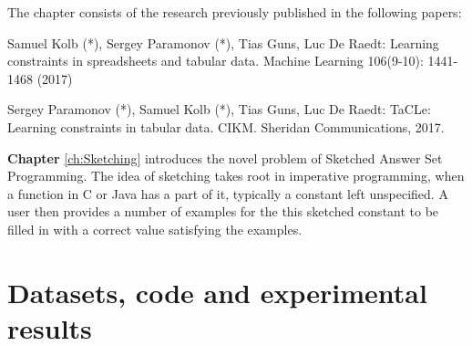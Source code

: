 The chapter consists of the research previously published in the following papers:

\begin{addmargin}[2em]{2em}
Samuel Kolb (*), Sergey Paramonov (*), Tias Guns, Luc De Raedt:
  Learning constraints in spreadsheets and tabular data. Machine
  Learning 106(9-10): 1441-1468 (2017)


Sergey Paramonov (*), Samuel Kolb (*), Tias Guns, Luc De Raedt:
TaCLe: Learning constraints in tabular data. CIKM. Sheridan
Communications, 2017.
\end{addmargin}


\textbf{Chapter} \ref{ch:Sketching} introduces the novel problem of
Sketched Answer Set Programming. The idea of sketching takes root in
imperative programming, when a function in C or Java has a part of it,
typically a constant left unspecified. A user then provides a number
of examples for the this sketched constant to be filled in with a
correct value satisfying the examples. 

\section{Datasets, code and experimental results}













\cleardoublepage

